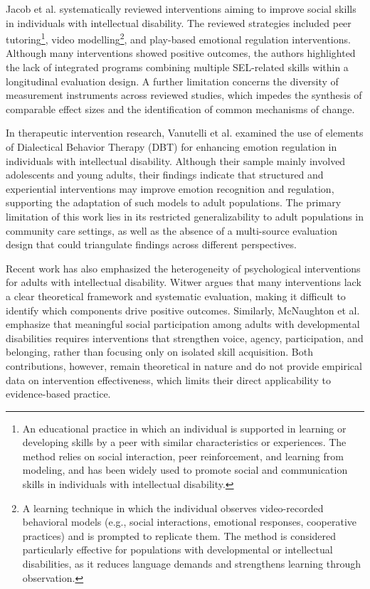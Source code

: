 \documentclass[journal]{IEEEtran}
\begin{document}
Jacob et al. \cite{jacob2022} systematically reviewed interventions aiming to improve social skills in individuals with intellectual disability. The reviewed strategies included peer tutoring\footnote{An educational practice in which an individual is supported in learning or developing skills by a peer with similar characteristics or experiences. The method relies on social interaction, peer reinforcement, and learning from modeling, and has been widely used to promote social and communication skills in individuals with intellectual disability.}, video modelling\footnote{A learning technique in which the individual observes video-recorded behavioral models (e.g., social interactions, emotional responses, cooperative practices) and is prompted to replicate them. The method is considered particularly effective for populations with developmental or intellectual disabilities, as it reduces language demands and strengthens learning through observation.}, and play-based emotional regulation interventions. Although many interventions showed positive outcomes, the authors highlighted the lack of integrated programs combining multiple SEL-related skills within a longitudinal evaluation design. A further limitation concerns the diversity of measurement instruments across reviewed studies, which impedes the synthesis of comparable effect sizes and the identification of common mechanisms of change.

In therapeutic intervention research, Vanutelli et al. \cite{vanutelli2023} examined the use of elements of Dialectical Behavior Therapy (DBT) for enhancing emotion regulation in individuals with intellectual disability. Although their sample mainly involved adolescents and young adults, their findings indicate that structured and experiential interventions may improve emotion recognition and regulation, supporting the adaptation of such models to adult populations. The primary limitation of this work lies in its restricted generalizability to adult populations in community care settings, as well as the absence of a multi-source evaluation design that could triangulate findings across different perspectives.

Recent work has also emphasized the heterogeneity of psychological interventions for adults with intellectual disability. Witwer \cite{witwer2022} argues that many interventions lack a clear theoretical framework and systematic evaluation, making it difficult to identify which components drive positive outcomes. Similarly, McNaughton et al. \cite{mcnaughton2025} emphasize that meaningful social participation among adults with developmental disabilities requires interventions that strengthen voice, agency, participation, and belonging, rather than focusing only on isolated skill acquisition. Both contributions, however, remain theoretical in nature and do not provide empirical data on intervention effectiveness, which limits their direct applicability to evidence-based practice.
\end{document}
